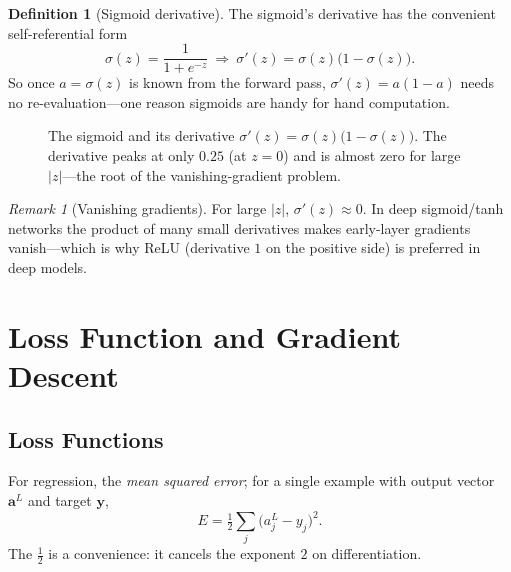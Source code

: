 \documentclass[11pt,a4paper]{report}
\theoremstyle{definition}
\newtheorem{definition}{Definition}[chapter]
\theoremstyle{remark}
\newtheorem*{remark}{Remark}
\newcommand{\vy}{\mathbf{y}}
\newcommand{\va}{\mathbf{a}}
\begin{document}
\begin{definition}[Sigmoid derivative]
The sigmoid's derivative has the convenient self-referential form
\begin{equation}
\sigma(z)=\frac{1}{1+e^{-z}}\ \Longrightarrow\
\sigma'(z)=\sigma(z)\bigl(1-\sigma(z)\bigr).
\label{eq:sigder}
\end{equation}
So once $a=\sigma(z)$ is known from the forward pass, $\sigma'(z)=a(1-a)$ needs
no re-evaluation---one reason sigmoids are handy for hand computation.
\end{definition}

\begin{figure}[ht]
\centering
{}
\caption{The sigmoid and its derivative $\sigma'(z)=\sigma(z)\bigl(1-\sigma(z)\bigr)$.
The derivative peaks at only $0.25$ (at $z=0$) and is almost zero for large
$|z|$---the root of the vanishing-gradient problem.}
\label{fig:sigder}
\end{figure}

\begin{remark}[Vanishing gradients]
For large $|z|$, $\sigma'(z)\approx0$. In deep sigmoid/tanh networks the product
of many small derivatives makes early-layer gradients vanish---which is why ReLU
(derivative $1$ on the positive side) is preferred in deep models.
\end{remark}

\chapter{Loss Function and Gradient Descent}

\section{Loss Functions}
For regression, the \emph{mean squared error}; for a single example with output
vector $\va^{L}$ and target $\vy$,
\begin{equation}
E=\tfrac12\sum_{j}\bigl(a^{L}_{j}-y_j\bigr)^2 .
\label{eq:mse}
\end{equation}
The $\tfrac12$ is a convenience: it cancels the exponent $2$ on
differentiation.
\end{document}
